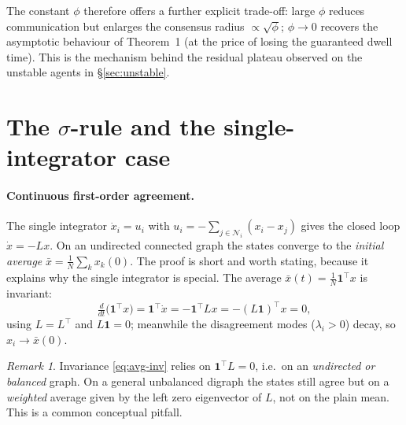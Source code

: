 \documentclass[11pt,a4paper]{article}
\theoremstyle{remark}
\newtheorem{remark}{Remark}
\newcommand{\Ni}{\mathcal{N}_i}
\newcommand{\T}{^{\top}}
\begin{document}
The constant $\phi$ therefore offers a further explicit trade-off: large $\phi$ reduces communication
but enlarges the consensus radius $\propto\sqrt{\phi}$; $\phi\!\to\!0$ recovers the asymptotic
behaviour of Theorem~1 (at the price of losing the guaranteed dwell time). This is the mechanism
behind the residual plateau observed on the unstable agents in \S\ref{sec:unstable}.

\section{The $\sigma$-rule and the single-integrator case}
\label{sec:sigma}

\paragraph{Continuous first-order agreement.} The single integrator $\dot x_i=u_i$ with
$u_i=-\sum_{j\in\Ni}(x_i-x_j)$ gives the closed loop $\dot x=-Lx$. On an undirected connected graph
the states converge to the \emph{initial average} $\bar x=\tfrac1N\sum_k x_k(0)$. The proof is short
and worth stating, because it explains why the single integrator is special. The average
$\bar x(t)=\tfrac1N\mathbf 1\T x$ is invariant:
\begin{equation}
\tfrac{d}{dt}\big(\mathbf 1\T x\big) = \mathbf 1\T\dot x = -\mathbf 1\T L x = -(L\mathbf 1)\T x = 0,
\label{eq:avg-inv}
\end{equation}
using $L=L\T$ and $L\mathbf 1=0$; meanwhile the disagreement modes ($\lambda_i>0$) decay, so
$x_i\to\bar x(0)$.
\begin{remark}
Invariance \eqref{eq:avg-inv} relies on $\mathbf 1\T L=0$, i.e.\ on an \emph{undirected or balanced}
graph. On a general unbalanced digraph the states still agree but on a \emph{weighted} average given
by the left zero eigenvector of $L$, not on the plain mean. This is a common conceptual pitfall.
\end{remark}
\end{document}
